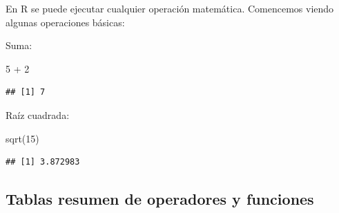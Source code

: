 \documentclass[
]{book}
\newenvironment{Shaded}{\begin{snugshade}}{\end{snugshade}}
\newcommand{\DecValTok}[1]{\textcolor[rgb]{0.00,0.00,0.81}{#1}}
\newcommand{\FunctionTok}[1]{\textcolor[rgb]{0.00,0.00,0.00}{#1}}
\newcommand{\NormalTok}[1]{#1}
\newcommand{\SpecialCharTok}[1]{\textcolor[rgb]{0.00,0.00,0.00}{#1}}
\begin{document}
En R se puede ejecutar cualquier operación matemática. Comencemos viendo
algunas operaciones básicas:

Suma:

\begin{Shaded}
\begin{Highlighting}[]
\DecValTok{5} \SpecialCharTok{+} \DecValTok{2}
\end{Highlighting}
\end{Shaded}

\begin{verbatim}
## [1] 7
\end{verbatim}

Raíz cuadrada:

\begin{Shaded}
\begin{Highlighting}[]
\FunctionTok{sqrt}\NormalTok{(}\DecValTok{15}\NormalTok{)}
\end{Highlighting}
\end{Shaded}

\begin{verbatim}
## [1] 3.872983
\end{verbatim}

\hypertarget{tablas_resumen}{%
\subsection{Tablas resumen de operadores y funciones}\label{tablas_resumen}}
\end{document}
